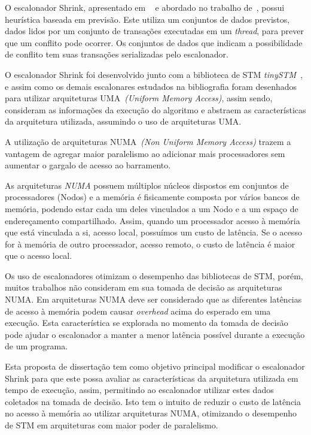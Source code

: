 \documentclass[diss-proposta,nocipinfo]{texufpel}
\begin{document}
O escalonador Shrink, apresentado em ~\cite{dragojevic09} e abordado no trabalho de~\cite{sanzo17}, possui heurística baseada em previsão. Este utiliza um conjuntos de dados previstos, dados lidos por um conjunto de transações executadas em um \emph{thread}, para prever que um conflito pode ocorrer. Os conjuntos de dados que indicam a possibilidade de conflito tem suas transações serializadas pelo escalonador.

O escalonador Shrink foi desenvolvido junto com a biblioteca de STM \emph{tinySTM}~\cite{TINY}, e assim como os demais escalonares estudados na bibliografia foram desenhados para utilizar arquiteturas UMA~\emph{(Uniform Memory Access)}, assim sendo, consideram as informações da execução do algoritmo e abstraem as características da arquitetura utilizada, assumindo o uso de arquiteturas UMA.

A utilização de arquiteturas NUMA~\emph{(Non Uniform Memory Access)} trazem a vantagem de agregar maior paralelismo ao adicionar mais processadores sem aumentar o gargalo de acesso ao barramento.

As arquiteturas \emph{NUMA} possuem múltiplos núcleos dispostos em conjuntos de processadores (Nodos) e a memória é fisicamente composta por vários bancos de memória, podendo estar cada um deles vinculados a um Nodo e a um espaço de endereçamento compartilhado. Assim, quando um processador acesso à memória que está vinculada a si, acesso local, possuímos um custo de latência. Se o acesso for à memória de outro processador, acesso remoto, o custo de latência é maior que o acesso local.

Os uso de escalonadores otimizam o desempenho das bibliotecas de STM, porém, muitos trabalhos não consideram em sua tomada de decisão as arquiteturas NUMA. Em arquiteturas NUMA deve ser considerado que as diferentes latências de acesso à memória podem causar \emph{overhead} acima do esperado em uma execução. Esta característica se explorada no momento da tomada de decisão pode ajudar o escalonador a manter a menor latência possível durante a execução de um programa.

Esta proposta de dissertação tem como objetivo principal modificar o escalonador Shrink para que este possa avaliar as características da arquitetura utilizada em tempo de execução, assim, permitindo ao escalonador utilizar estes dados coletados na tomada de decisão. Isto tem o intuito de reduzir o custo de latência no acesso à memória ao utilizar arquiteturas NUMA, otimizando o desempenho de STM em arquiteturas com maior poder de paralelismo.
\end{document}

